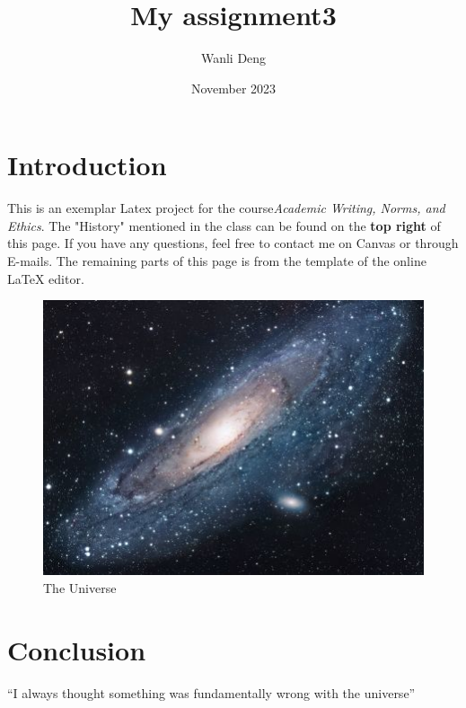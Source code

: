 \documentclass{article}
\title{My assignment3}
\author{Wanli Deng}
\date{November 2023}
\begin{document}
\maketitle

\section{Introduction}
This is an exemplar Latex project for the course\emph{Academic Writing, Norms, and Ethics}. The "History" mentioned in the class can be found on the \textbf{top right} of this page. If you have any questions, feel free to contact me on Canvas or through E-mails. The remaining parts of this page is from the template of the online {\LaTeX} editor.

\begin{figure}[h!]
\centering
\includegraphics[scale=1.7]{universe}
\caption{The Universe}
\label{fig:universe}
\end{figure}

\section{Conclusion}
``I always thought something was fundamentally wrong with the universe'' \citep{adams1995hitchhiker}



\end{document}
